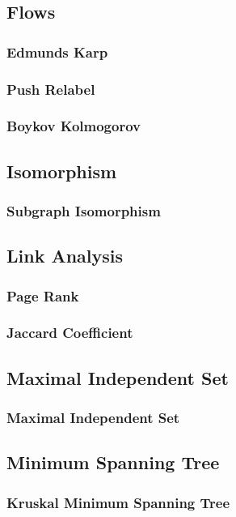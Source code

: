 \subsection{Flows}
\subsubsection{Edmunds Karp}
\subsubsection{Push Relabel}
\subsubsection{Boykov Kolmogorov}

\subsection{Isomorphism}
\subsubsection{Subgraph Isomorphism}

\subsection{Link Analysis}
\subsubsection{Page Rank}
\subsubsection{Jaccard Coefficient}

\subsection{Maximal Independent Set}
\subsubsection{Maximal Independent Set}

\subsection{Minimum Spanning Tree}
\subsubsection{Kruskal Minimum Spanning Tree}
